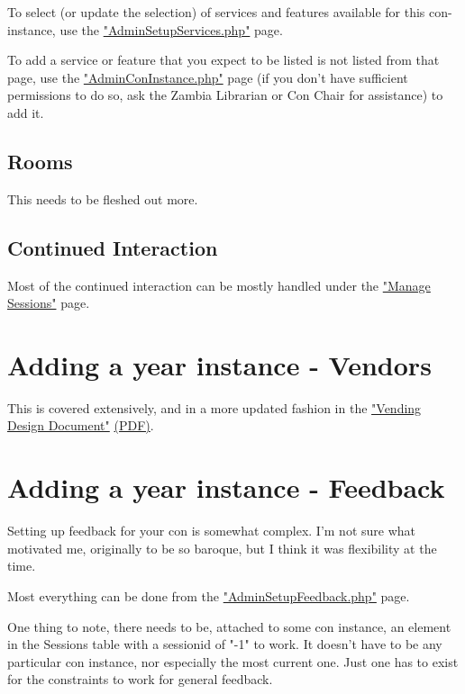 \documentclass[captions=tablesignature]{scrartcl}
\begin{document}
To select (or update the selection) of services and features
available for this con-instance, use the \href{../webpages/AdminSetupServices.php}{"AdminSetupServices.php"}
page.

To add a service or feature that you expect to be listed is not
listed from that page, use the \href{../webpages/AdminConInstance.php}{"AdminConInstance.php"} page (if you
don't have sufficient permissions to do so, ask the Zambia
Librarian or Con Chair for assistance) to add it.
\subsection{Rooms}
\label{sec-13-3}

This needs to be fleshed out more.

\subsection{Continued Interaction}
\label{sec-13-4}

Most of the continued interaction can be mostly handled under the
\href{../webpages/StaffManageSessions.php}{"Manage Sessions"} page.

\section{Adding a year instance - Vendors}
\label{sec-14}

This is covered extensively, and in a more updated fashion in the
\href{./Vending_Design_Document.html}{"Vending Design Document"} \href{./Vending_Design_Document.pdf}{(PDF)}.

\section{Adding a year instance - Feedback}
\label{sec-15}

Setting up feedback for your con is somewhat complex.  I'm not sure
what motivated me, originally to be so baroque, but I think it was
flexibility at the time.

Most everything can be done from the \href{../webpages/AdminSetupFeedback.php}{"AdminSetupFeedback.php"} page.

One thing to note, there needs to be, attached to some con instance,
an element in the Sessions table with a sessionid of "-1" to work.
It doesn't have to be any particular con instance, nor especially
the most current one.  Just one has to exist for the constraints to
work for general feedback.
\end{document}
